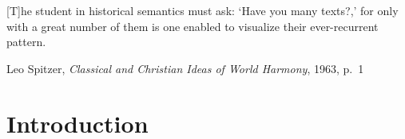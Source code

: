\documentclass{article}
\theoremstyle{plain}
\theoremstyle{definition}
\theoremstyle{remark}
\begin{document}

\printAffiliationsAndNotice{}  %

\newcommand{\imputations}{27\,160\ }

\begin{abstract}
We conduct the first large-scale evaluation of machine-generated imputations for a damaged Ancient Greek papyrus. We compare the imputations' topics with the known author's other works under two models: hard topics with an exact conjugate Dirichlet--multinomial posterior, and soft topics from a seeded latent Dirichlet allocation cut into two, whose posterior is sampled with NUTS. Although the space of restorations formally allowed by the joint restrictions of verse and syntax is still much too large to explore ergodically, we are able to show that topic modelling a large-enough sample of it over many chains yields topic lifts relative to the baseline that agree across chains started far apart, a first indication that large artificial imputation corpora hold potential for future philological applications. 
\end{abstract}

\epigraph{[T]he student in historical semantics must ask: `Have you many texts?,' for only with a great number of them is one enabled to visualize their ever-recurrent pattern.}{Leo Spitzer, \textit{Classical and Christian Ideas of World Harmony}, 1963, p.\ 1}

\section{Introduction}
\label{introduction}
\end{document}

